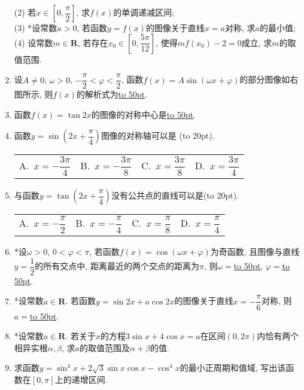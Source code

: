 \documentclass[10pt,a4paper]{article}
\newcommand{\blank}[1]{\underline{\hbox to #1pt{}}}
\newcommand{\bracket}[1]{(\hbox to #1pt{})}
\newcommand{\fourch}[4]{\par\begin{tabular}{p{.23\textwidth}p{.23\textwidth}p{.23\textwidth}p{.23\textwidth}}
A.~#1 &B.~#2& C.~#3& D.~#4
\end{tabular}}
\begin{document}
\begin{enumerate}[1.]
(2) 若$x\in [0,\dfrac{\pi}2]$, 求$f(x)$的单调递减区间;\\
(3) *设常数$a>0$, 若函数$y=f(x)$的图像关于直线$x=a$对称, 求$a$的最小值;\\
(4) 设常数$m\in \mathbf{R}$, 若存在$x_0\in [0,\dfrac{5\pi}{12}]$, 使得$mf(x_0)-2=0$成立, 求$m$的取值范围.
\item 设$A\ne 0$, $\omega>0$, $-\dfrac{\pi}2<\varphi<\dfrac{\pi}2$, 函数$f(x)=A\sin(\omega x+\varphi)$的部分图像如右图所示, 则$f(x)$的解析式为\blank{50}.
\begin{center}
\end{center}
\item 函数$f(x)=\tan 2x$的图像的对称中心是\blank{50}.
\item 函数$y=\sin(2x+\dfrac{\pi}4)$图像的对称轴可以是 \bracket{20}.
\fourch{$x=-\dfrac{3\pi}4$}{$x=-\dfrac{3\pi}8$}{$x=\dfrac{3\pi}8$}{$x=\dfrac{3\pi}4$}
\item 与函数$y=\tan(2x+\dfrac{\pi}4)$没有公共点的直线可以是\bracket{20}.
\fourch{$x=-\dfrac{\pi}2$}{$x=-\dfrac{\pi}4$}{$x=\dfrac{\pi}8$}{$x=\dfrac{\pi}4$}
\item *设$\omega>0$, $0<\varphi <\pi$, 若函数$f(x)=\cos(\omega x+\varphi)$为奇函数, 且图像与直线$y=\dfrac 12$的所有交点中, 距离最近的两个交点的距离为$\pi$, 则$\omega =$\blank{50}, $\varphi=$\blank{50}.
\item *设常数$a\in \mathbf{R}$. 若函数$y=\sin 2x+a\cos 2x$的图像关于直线$x=-\dfrac{\pi}6$对称, 则$a=$\blank{50}.
\item *设常数$a\in \mathbf{R}$. 若关于$x$的方程$3\sin x+4\cos x=a$在区间$(0,2\pi)$内恰有两个相异实根$\alpha,\beta$, 求$a$的取值范围及$\alpha+\beta$的值.
\item 求函数$y=\sin^4 x+2\sqrt 3\sin x\cos x-\cos^4 x$的最小正周期和值域, 写出该函数在$[0,\pi]$上的递增区间.


\end{enumerate}
\end{document}
